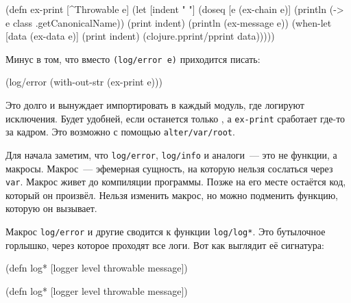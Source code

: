 \else

\begin{english}
  \begin{clojure}
(defn ex-print
  [^Throwable e]
  (let [indent "  "]
    (doseq [e (ex-chain e)]
      (println (-> e class .getCanonicalName))
      (print indent)
      (println (ex-message e))
      (when-let [data (ex-data e)]
        (print indent)
        (clojure.pprint/pprint data)))))
  \end{clojure}
\end{english}

\fi

\noindent
Минус в том, что вместо \verb|(log/error e)| приходится писать:

\begin{english}
  \begin{clojure}
(log/error (with-out-str (ex-print e)))
  \end{clojure}
\end{english}

Это долго и вынуждает импортировать  в каждый модуль, где логируют
исключения. Будет удобней, если останется только , а
\verb|ex-print| сработает где-то за кадром. Это возможно с помощью
\texttt{alter\-/var\-/root}.

Для начала заметим, что \verb|log/error|, \verb|log/info| и аналоги~--- это не
функции, а макросы. Макрос~--- эфемерная сущность, на которую нельзя сослаться
через \verb|var|. Макрос живет до компиляции программы. Позже на его месте
остаётся код, который он произвёл. Нельзя изменить макрос, но можно подменить
функцию, которую он вызывает.


Макрос \verb|log/error| и другие сводится к функции \verb|log/log*|. Это
бутылочное горлышко, через которое проходят все логи. Вот как выглядит её
сигнатура:

\ifnarrow

\begin{english}
  \begin{clojure}
(defn log*
  [logger level throwable message])
  \end{clojure}
\end{english}

\else

\begin{english}
  \begin{clojure}
(defn log* [logger level throwable message])
  \end{clojure}
\end{english}

